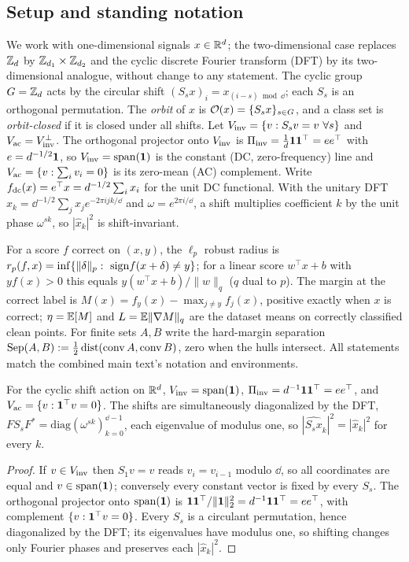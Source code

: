 \subsection{Setup and standing notation}\label{app:ft-setup}
We work with one-dimensional signals $x\in\mathbb{R}^{d}$; the two-dimensional case
replaces $\mathbb{Z}_{d}$ by $\mathbb{Z}_{d_1}\times\mathbb{Z}_{d_2}$ and the cyclic discrete Fourier
transform (DFT) by its two-dimensional analogue, without change to any
statement. The cyclic group $G=\mathbb{Z}_{d}$ acts by the circular shift
$(S_sx)_i=x_{(i-s)\bmod\dd}$; each $S_s$ is an orthogonal permutation. The
\emph{orbit} of $x$ is $\mathcal O(x)=\{S_sx\}_{s\in G}$, and a class set is
\emph{orbit-closed} if it is closed under all shifts. Let
$V_{\mathrm{inv}}=\{v:S_sv=v\ \forall s\}$ and $V_{\mathrm{ac}}=V_{\mathrm{inv}}^{\perp}$. The orthogonal
projector onto $V_{\mathrm{inv}}$ is $\Pi_{\mathrm{inv}}=\tfrac1{d}\mathbf 1\mathbf 1^\top=ee^\top$ with
$e=d^{-1/2}\mathbf 1$, so $V_{\mathrm{inv}}=\mathrm{span}(\mathbf 1)$ is the constant (DC,
zero-frequency) line and $V_{\mathrm{ac}}=\{v:\sum_iv_i=0\}$ is its zero-mean (AC)
complement. Write $f_{\mathrm{dc}}(x)=e^\top x=d^{-1/2}\sum_ix_i$ for the unit DC
functional. With the unitary DFT $\hat x_k=\dd^{-1/2}\sum_jx_je^{-2\pi ijk/\dd}$
and $\omega=e^{2\pi i/\dd}$, a shift multiplies coefficient $k$ by the unit phase
$\omega^{sk}$, so $|\hat x_k|^2$ is shift-invariant.

For a score $f$ correct on $(x,y)$, the $\ell_p$ robust radius is
$r_p(f,x)=\inf\{\lVert\delta\rVert_p:\ \mathrm{sign} f(x+\delta)\neq y\}$; for a linear
score $w^\top x+b$ with $yf(x)>0$ this equals $y(w^\top x+b)/\lVert w\rVert_q$
($q$ dual to $p$). The margin at the correct label is
$M(x)=f_y(x)-\max_{j\neq y}f_j(x)$, positive exactly when $x$ is correct;
$\eta=\mathbb{E}[M]$ and $L=\mathbb{E}\lVert\nabla M\rVert_q$ are the dataset means on correctly
classified clean points. For finite sets $A,B$ write the hard-margin separation
$\mathrm{Sep}(A,B):=\tfrac12\operatorname{dist}(\operatorname{conv} A,\operatorname{conv} B)$, zero when the hulls intersect. All
statements match the combined main text's notation and environments.

\begin{lemma}\label{lem:cyclic-fixed}
For the cyclic shift action on $\mathbb{R}^d$,
$V_{\mathrm{inv}}=\mathrm{span}(\mathbf 1)$, $\Pi_{\mathrm{inv}}=d^{-1}\mathbf 1\mathbf 1^\top=ee^\top$, and
$V_{\mathrm{ac}}=\{v:\mathbf 1^\top v=0\}$. The shifts are simultaneously diagonalized by the
DFT, $FS_sF^{*}=\mathrm{diag}(\omega^{sk})_{k=0}^{\dd-1}$, each eigenvalue of
modulus one, so $|\widehat{S_sx}_k|^2=|\hat x_k|^2$ for every $k$.
\end{lemma}
\begin{proof}
If $v\in V_{\mathrm{inv}}$ then $S_1v=v$ reads $v_i=v_{i-1}$ modulo $\dd$, so all
coordinates are equal and $v\in\mathrm{span}(\mathbf 1)$; conversely every constant
vector is fixed by every $S_s$. The orthogonal projector onto $\mathrm{span}(\mathbf 1)$
is $\mathbf 1\mathbf 1^\top/\lVert\mathbf 1\rVert_2^2=d^{-1}\mathbf 1\mathbf 1^\top=ee^\top$, with
complement $\{v:\mathbf 1^\top v=0\}$. Every $S_s$ is a circulant permutation, hence
diagonalized by the DFT; its eigenvalues have modulus one, so shifting changes
only Fourier phases and preserves each $|\hat x_k|^2$.
\end{proof}


